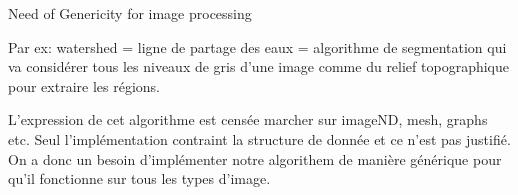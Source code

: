 \documentclass[12pt,aspectratio=169]{beamer}
\begin{document}
\begin{frame}[fragile]{Need of Genericity for image processing}
{    Par ex: watershed = ligne de partage des eaux = algorithme de segmentation qui va considérer tous les niveaux de gris d'une image comme du relief topographique pour extraire les régions.
    
    L'expression de cet algorithme est censée marcher sur imageND, mesh, graphs etc.
    Seul l'implémentation contraint la structure de donnée et ce n'est pas justifié.
    On a donc un besoin d'implémenter notre algorithem de manière générique pour qu'il fonctionne sur tous les types d'image.
  }
\end{frame}

\end{document}
